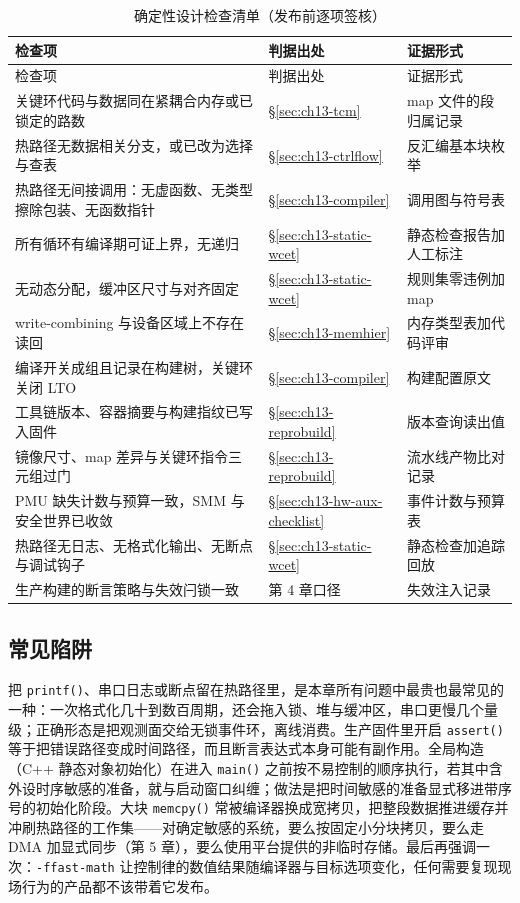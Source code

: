\documentclass[12pt,a4paper,fontset=fandol]{ctexbook}
\newcommand{\Fn}[1]{\texttt{#1()}}
\newcommand{\Tp}[1]{\texttt{#1}}
\newcommand{\Lang}[1]{\textsf{#1}}
\begin{document}
\begin{longtable}{>{\raggedright\arraybackslash}p{}>{\raggedright\arraybackslash}p{}>{\raggedright\arraybackslash}p{}}
\caption{确定性设计检查清单（发布前逐项签核）}\label{tab:ch13-checklist}\\
\toprule
检查项 & 判据出处 & 证据形式 \\
\midrule
\endfirsthead
\toprule
检查项 & 判据出处 & 证据形式 \\
\midrule
\endhead
\bottomrule
\endfoot
\endlastfoot
关键环代码与数据同在紧耦合内存或已锁定的路数 & \S\ref{sec:ch13-tcm} & map 文件的段归属记录 \\
热路径无数据相关分支，或已改为选择与查表 & \S\ref{sec:ch13-ctrlflow} & 反汇编基本块枚举 \\
热路径无间接调用：无虚函数、无类型擦除包装、无函数指针 & \S\ref{sec:ch13-compiler} & 调用图与符号表 \\
所有循环有编译期可证上界，无递归 & \S\ref{sec:ch13-static-wcet} & 静态检查报告加人工标注 \\
无动态分配，缓冲区尺寸与对齐固定 & \S\ref{sec:ch13-static-wcet} & 规则集零违例加 map \\
write-combining 与设备区域上不存在读回 & \S\ref{sec:ch13-memhier} & 内存类型表加代码评审 \\
编译开关成组且记录在构建树，关键环关闭 LTO & \S\ref{sec:ch13-compiler} & 构建配置原文 \\
工具链版本、容器摘要与构建指纹已写入固件 & \S\ref{sec:ch13-reprobuild} & 版本查询读出值 \\
镜像尺寸、map 差异与关键环指令三元组过门 & \S\ref{sec:ch13-reprobuild} & 流水线产物比对记录 \\
PMU 缺失计数与预算一致，SMM 与安全世界已收敛 & \S\ref{sec:ch13-hw-aux-checklist} & 事件计数与预算表 \\
热路径无日志、无格式化输出、无断点与调试钩子 & \S\ref{sec:ch13-static-wcet} & 静态检查加追踪回放 \\
生产构建的断言策略与失效闩锁一致 & 第 4 章口径 & 失效注入记录 \\
\end{longtable}

\subsection{常见陷阱}

把 \Fn{printf}、串口日志或断点留在热路径里，是本章所有问题中最贵也最常见的一种：一次格式化几十到数百周期，还会拖入锁、堆与缓冲区，串口更慢几个量级；正确形态是把观测面交给无锁事件环，离线消费。生产固件里开启 \Fn{assert} 等于把错误路径变成时间路径，而且断言表达式本身可能有副作用。全局构造（\Lang{C++} 静态对象初始化）在进入 \Fn{main} 之前按不易控制的顺序执行，若其中含外设时序敏感的准备，就与启动窗口纠缠；做法是把时间敏感的准备显式移进带序号的初始化阶段。大块 \Fn{memcpy} 常被编译器换成宽拷贝，把整段数据推进缓存并冲刷热路径的工作集——对确定敏感的系统，要么按固定小分块拷贝，要么走 DMA 加显式同步（第 5 章），要么使用平台提供的非临时存储。最后再强调一次：\Tp{-ffast-math} 让控制律的数值结果随编译器与目标选项变化，任何需要复现现场行为的产品都不该带着它发布。
\end{document}
